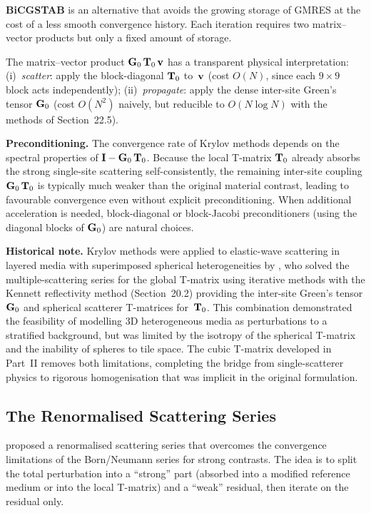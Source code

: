 \textbf{BiCGSTAB} \citep{vanderVorst1992} is an alternative that avoids the
growing storage of GMRES at the cost of a less smooth convergence history.
Each iteration requires two matrix--vector products but only a fixed amount
of storage.

The matrix--vector product $\mathbf{G}_0\,\mathbf{T}_0\,\mathbf{v}$ has a transparent physical
interpretation: (i)~\emph{scatter}: apply the block-diagonal $\mathbf{T}_0$
to~$\mathbf{v}$ (cost $O(N)$, since each $9\times 9$ block acts independently);
(ii)~\emph{propagate}: apply the dense inter-site Green's tensor $\mathbf{G}_0$
(cost $O(N^2)$ naively, but reducible to $O(N\log N)$ with the methods of
Section~22.5).

\textbf{Preconditioning.}  The convergence rate of Krylov methods depends
on the spectral properties of $\mathbf{I} - \mathbf{G}_0\,\mathbf{T}_0$.  Because the local
T-matrix $\mathbf{T}_0$ already absorbs the strong single-site scattering
self-consistently, the remaining inter-site coupling $\mathbf{G}_0\,\mathbf{T}_0$ is
typically much weaker than the original material contrast, leading to
favourable convergence even without explicit preconditioning.  When
additional acceleration is needed, block-diagonal or block-Jacobi
preconditioners (using the diagonal blocks of $\mathbf{G}_0$) are natural choices.

\textbf{Historical note.}  Krylov methods were applied to elastic-wave
scattering in layered media with superimposed spherical heterogeneities by
\citet{Nestor1996}, who solved the multiple-scattering series for the
global T-matrix using iterative methods with the Kennett reflectivity
method (Section~20.2) providing the inter-site Green's tensor $\mathbf{G}_0$ and
spherical scatterer T-matrices for~$\mathbf{T}_0$.  This combination demonstrated
the feasibility of modelling 3D heterogeneous media as perturbations to a
stratified background, but was limited by the isotropy of the spherical
T-matrix and the inability of spheres to tile space.  The cubic T-matrix
developed in Part~II removes both limitations, completing the bridge from
single-scatterer physics to rigorous homogenisation that was implicit in
the original formulation.

\subsection{The Renormalised Scattering Series}

\citet{JakobsenWu2016} proposed a renormalised scattering
series that overcomes the convergence limitations of the Born/Neumann
series for strong contrasts.  The idea is to split the total perturbation
into a ``strong'' part (absorbed into a modified reference medium or into
the local T-matrix) and a ``weak'' residual, then iterate on the residual
only.

